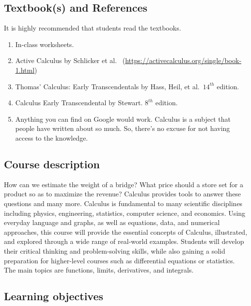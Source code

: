 \documentclass[
]{article}
\begin{document}
\hypertarget{textbooks-and-references}{%
\subsection*{Textbook(s) and References}\label{textbooks-and-references}}

It is highly recommended that students read the textbooks.

\begin{enumerate}
\def\labelenumi{\arabic{enumi}.}
\item
  In-class worksheets.
\item
  Active Calculus by Schlicker et al.~
  (\url{https://activecalculus.org/single/book-1.html})
\item
  Thomas' Calculus: Early Transcendentals by Hass, Heil, et al.~\(14^{th}\) edition.
\item
  Calculus Early Transcendental by Stewart. \(8^{th}\) edition.
\item
  Anything you can find on Google would work.
  Calculus is a subject that people have written about
  so much. So, there's no excuse for not having access
  to the knowledge.
\end{enumerate}

\hypertarget{course-description}{%
\subsection*{Course description}\label{course-description}}

How can we estimate the weight of a bridge? What price should a store set for a product so as to maximize the revenue? Calculus provides tools to answer these questions and many more. Calculus is fundamental to many scientific disciplines including physics, engineering, statistics, computer science, and economics. Using everyday language and graphs, as well as equations, data, and numerical approaches, this course will provide the essential concepts of Calculus, illustrated, and explored through a wide range of real-world examples. Students will develop their critical thinking and problem-solving skills, while also gaining a solid preparation for higher-level courses such as differential equations or statistics. The main topics are functions, limits, derivatives, and integrals.

\hypertarget{learning-objectives}{%
\subsection*{Learning objectives}\label{learning-objectives}}
\end{document}
